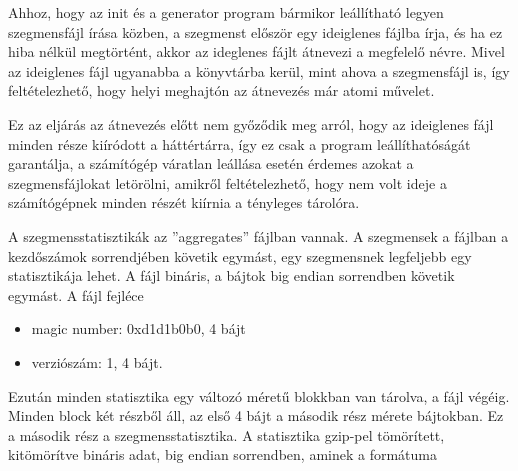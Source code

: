 Ahhoz, hogy az init és a generator program bármikor leállítható legyen szegmensfájl írása közben, a szegmenst először egy ideiglenes fájlba írja, és ha ez hiba nélkül megtörtént, akkor az ideglenes fájlt átnevezi a megfelelő névre.
Mivel az ideiglenes fájl ugyanabba a könyvtárba kerül, mint ahova a szegmensfájl is, így feltételezhető, hogy helyi meghajtón az átnevezés már atomi művelet.

Ez az eljárás az átnevezés előtt nem győződik meg arról, hogy az ideiglenes fájl minden része
kiíródott a háttértárra, így ez csak a program leállíthatóságát garantálja, a számítógép váratlan leállása esetén érdemes azokat a szegmensfájlokat letörölni, amikről feltételezhető, hogy nem volt ideje a számítógépnek minden részét kiírnia a tényleges tárolóra.

A szegmensstatisztikák az ''aggregates'' fájlban vannak. A szegmensek a fájlban a kezdőszámok sorrendjében követik egymást, egy szegmensnek legfeljebb egy statisztikája lehet.
A fájl bináris, a bájtok {\color{red}big endian} sorrendben követik egymást. A fájl fejléce
\begin{itemize}
\item {\color{red}magic number}: 0xd1d1b0b0, 4 bájt
\item verziószám: 1, 4 bájt.
\end{itemize}
Ezután minden statisztika egy változó méretű blokkban van tárolva, a fájl végéig. Minden block két részből áll, az első 4 bájt a második rész mérete bájtokban. Ez a második rész a szegmensstatisztika. A statisztika gzip-pel tömörített,
kitömörítve bináris adat, {\color{red}big endian sorrendben}, aminek a formátuma
